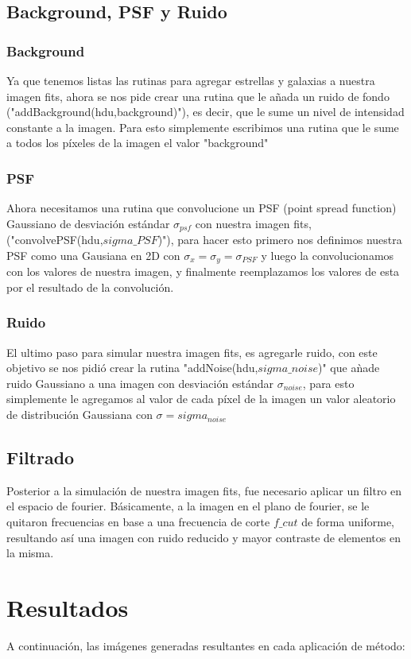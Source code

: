 \documentclass[twocolumn]{AS4201}
\begin{document}
\subsection{Background, PSF y Ruido}
\subsubsection{Background}
Ya que tenemos listas las rutinas para agregar estrellas y galaxias a nuestra imagen fits, ahora se nos pide crear una rutina que le a\~nada un ruido de fondo ("addBackground(hdu,background)"), es decir, que le sume un nivel de intensidad constante a la imagen. Para esto simplemente escribimos una rutina que le sume a todos los píxeles de la imagen el valor "background"
\subsubsection{PSF}
Ahora necesitamos una rutina que convolucione un PSF (point spread function) Gaussiano de desviación estándar $\sigma_{psf}$ con nuestra imagen fits, ("convolvePSF(hdu,$sigma\_PSF$)"), para hacer esto primero nos definimos nuestra PSF como una Gausiana en 2D con $\sigma_x=\sigma_y=\sigma_{PSF}$ y luego la convolucionamos con los valores de nuestra imagen, y finalmente reemplazamos los valores de esta por el resultado de la convolución.
\subsubsection{Ruido}
El ultimo paso para simular nuestra imagen fits, es agregarle ruido, con este objetivo se nos pidió crear la rutina "addNoise(hdu,$sigma\_noise$)" que a\`nade ruido Gaussiano a una imagen con desviación estándar $\sigma_{noise}$, para esto simplemente le agregamos al valor de cada píxel de la imagen un valor aleatorio de distribución Gaussiana con $\sigma=sigma_{noise}$
\subsection{Filtrado}
Posterior a la simulación de nuestra imagen fits, fue necesario aplicar un filtro en el espacio de fourier. Básicamente, a la imagen en el plano de fourier, se le quitaron frecuencias en base a una frecuencia de corte $f\_cut$ de forma uniforme, resultando así una imagen con ruido reducido y mayor contraste de elementos en la misma.

\section{Resultados}
A continuación, las imágenes generadas resultantes en cada aplicación de método: 
\end{document}
